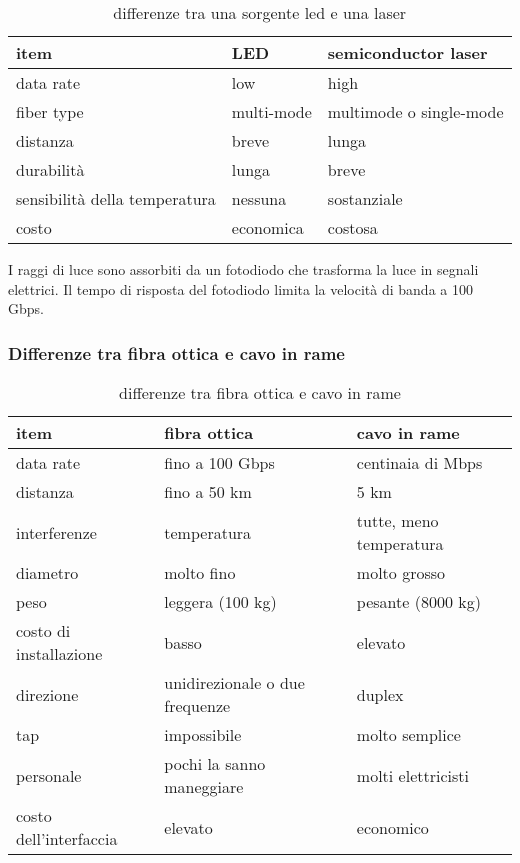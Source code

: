 \documentclass{article}
\begin{document}
\begin{table}[ht]
	\label{sorgenti_luminose}
	\centering
	\begin{tabular}{|l|l|l|}
		\hline 
		item & LED & semiconductor laser \\
		\hline
		data rate & low & high \\
		fiber type & multi-mode & multimode o single-mode \\
		distanza & breve & lunga \\
		durabilità & lunga & breve \\
		sensibilità della temperatura & nessuna & sostanziale \\
		costo & economica & costosa \\
		\hline
	\end{tabular}
	\caption{differenze tra una sorgente led e una laser}
\end{table}

I raggi di luce sono assorbiti da un fotodiodo che trasforma la luce in segnali
elettrici. Il tempo di risposta del fotodiodo limita la velocità di banda a 100
Gbps.\\

\subsubsection{Differenze tra fibra ottica e cavo in rame}

\begin{table}[ht]
	\label{ottica_rame}
	\centering
	\begin{tabular}{|l|l|l|}
		\hline
		 item & fibra ottica & cavo in rame \\
		 \hline
		 data rate & fino a 100 Gbps & centinaia di Mbps \\
		 distanza & fino a 50 km & 5 km \\
		 interferenze & temperatura & tutte, meno temperatura \\
		 diametro & molto fino & molto grosso \\
		 peso & leggera (100 kg) & pesante (8000 kg) \\
		 costo di installazione & basso & elevato \\
		 direzione & unidirezionale o due frequenze & duplex \\
		 tap & impossibile & molto semplice \\
		 personale & pochi la sanno maneggiare & molti elettricisti \\
		 costo dell'interfaccia & elevato & economico \\
		 \hline
	\end{tabular}
	\caption{differenze tra fibra ottica e cavo in rame}
\end{table}
\end{document}
